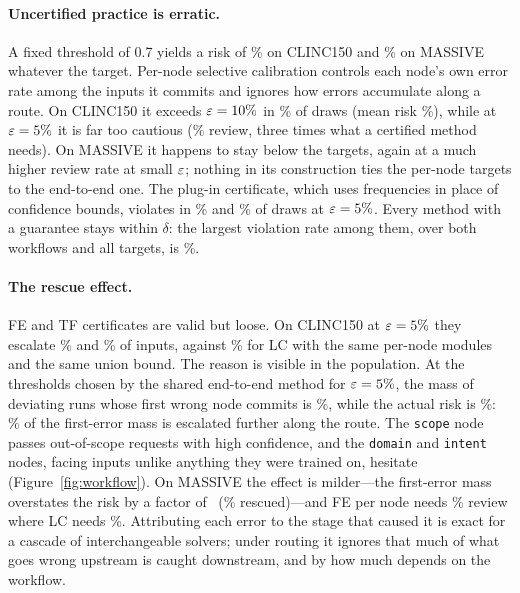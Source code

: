\paragraph{Uncertified practice is erratic.} A fixed threshold of 0.7 yields a risk of
\RiskCFixedFive\% on CLINC150 and \RiskMFixedFive\% on MASSIVE whatever the target. Per-node
selective calibration controls each node's own error rate among the inputs it commits and
ignores how errors accumulate along a route. On CLINC150 it exceeds $\varepsilon=10\%$ in
\ViolCPerNodeTen\% of draws (mean risk \RiskCPerNodeTen\%), while at $\varepsilon=5\%$ it is far too
cautious (\RevCPerNodeFive\% review, three times what a certified method needs). On MASSIVE
it happens to stay below the targets, again at a much higher review rate at small $\varepsilon$;
nothing in its construction ties the per-node targets to the end-to-end one. The plug-in
certificate, which uses frequencies in place of confidence bounds, violates in
\ViolCPlugFive\% and \ViolMPlugFive\% of draws at $\varepsilon=5\%$. Every method with a guarantee
stays within $\delta$: the largest violation rate among them, over both workflows and all
targets, is \MaxViolCertified\%.

\paragraph{The rescue effect.} FE and TF certificates are valid but loose. On CLINC150 at
$\varepsilon=5\%$ they escalate \RevCFEnodeFive\% and \RevCTFnodeFive\% of inputs, against
\RevCLCnodeFive\% for LC with the same per-node modules and the same union bound. The reason is
visible in the population. At the thresholds chosen by the shared end-to-end method for
$\varepsilon=5\%$, the mass of deviating runs whose first wrong node commits is \FdMassC\%, while the
actual risk is \RiskCSharedFive\%: \RescuedShareC\% of the first-error mass is escalated
further along the route. The \texttt{scope} node passes out-of-scope requests with high
confidence, and the \texttt{domain} and \texttt{intent} nodes, facing inputs unlike anything
they were trained on, hesitate (Figure~\ref{fig:workflow}). On MASSIVE the effect is
milder---the first-error mass overstates the risk by a factor of \FdRatioM\ (\RescuedShareM\%
rescued)---and FE per node needs \RevMFEnodeFive\% review where LC needs \RevMLCnodeFive\%.
Attributing each error to the stage that caused it is exact for a cascade of interchangeable
solvers; under routing it ignores that much of what goes wrong upstream is caught downstream,
and by how much depends on the workflow.

